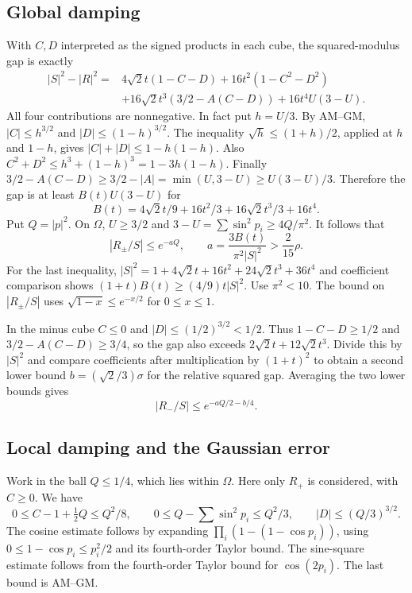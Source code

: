 \documentclass[11pt]{article}
\begin{document}
\subsection{Global damping}
\label{sec:global-damping}

With $C,D$ interpreted as the signed products in each cube, the squared-modulus gap is exactly
\[
\begin{aligned}
|S|^2-|R|^2={}&4\sqrt2t(1-C-D)+16t^2(1-C^2-D^2)\\
&+16\sqrt2t^3(3/2-A(C-D))+16t^4U(3-U).
\end{aligned}
\]
All four contributions are nonnegative. In fact put $h=U/3$. By AM--GM, $|C|\le h^{3/2}$ and $|D|\le(1-h)^{3/2}$. The inequality $\sqrt h\le(1+h)/2$, applied at $h$ and $1-h$, gives $|C|+|D|\le1-h(1-h)$. Also $C^2+D^2\le h^3+(1-h)^3=1-3h(1-h)$. Finally $3/2-A(C-D)\ge3/2-|A|=\min(U,3-U)\ge U(3-U)/3$. Therefore the gap is at least $B(t) U(3-U)$ for
\[
B(t)=4\sqrt2t/9+16t^2/3+16\sqrt2t^3/3+16t^4.
\]
Put $Q=|p|^2$. On $\Omega$, $U\ge3/2$ and $3-U=\sum\sin^2p_i\ge4Q/\pi^2$. It follows that
\[
|R_\pm/S|\le e^{-aQ},
\qquad a=\frac{3B(t)}{\pi^2|S|^2}>\frac{2}{15}\rho .
\]
For the last inequality, $|S|^2=1+4\sqrt2t+16t^2+24\sqrt2t^3+36t^4$ and coefficient comparison shows $(1+t)B(t)\ge(4/9)t|S|^2$. Use $\pi^2<10$. The bound on $|R_\pm/S|$ uses $\sqrt{1-x}\le e^{-x/2}$ for $0\le x\le1$.

In the minus cube $C\le0$ and $|D|\le(1/2)^{3/2}<1/2$. Thus $1-C-D\ge1/2$ and $3/2-A(C-D)\ge3/4$, so the gap also exceeds $2\sqrt2t+12\sqrt2t^3$. Divide this by $|S|^2$ and compare coefficients after multiplication by $(1+t)^2$ to obtain a second lower bound $b=(\sqrt2/3)\sigma$ for the relative squared gap. Averaging the two lower bounds gives
\[
|R_-/S|\le e^{-aQ/2-b/4}.
\]

\subsection{Local damping and the Gaussian error}
\label{sec:local-damping-and-the-gaussian-error}

Work in the ball $Q\le1/4$, which lies within $\Omega$. Here only $R_+$ is considered, with $C\ge0$. We have
\[
0\le C-1+\tfrac12Q\le Q^2/8,\qquad
0\le Q-\sum\sin^2p_i\le Q^2/3,\qquad |D|\le(Q/3)^{3/2}.
\]
The cosine estimate follows by expanding $\prod_i(1-(1-\cos p_i))$, using $0\le1-\cos p_i\le p_i^2/2$ and its fourth-order Taylor bound. The sine-square estimate follows from the fourth-order Taylor bound for $\cos(2p_i)$. The last bound is AM--GM.
\end{document}
